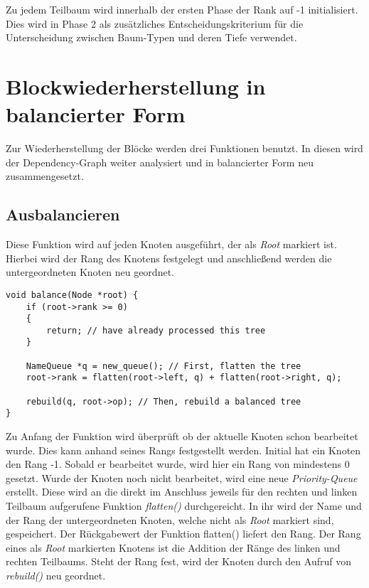 Zu jedem Teilbaum wird innerhalb der ersten Phase der Rank auf -1 initialisiert. Dies wird in Phase 2 als zusätzliches Entscheidungskriterium für die  Unterscheidung zwischen Baum-Typen und deren Tiefe verwendet.

\section{Blockwiederherstellung in balancierter Form}
Zur Wiederherstellung der Blöcke werden drei Funktionen benutzt. In diesen wird der Dependency-Graph weiter analysiert und in balancierter Form neu zusammengesetzt.

\subsection{Ausbalancieren}
Diese Funktion wird auf jeden Knoten ausgeführt, der als \textit{Root} markiert ist. Hierbei wird der Rang des Knotens festgelegt und anschließend werden die untergeordneten Knoten neu geordnet.\\

\begin{lstlisting}[caption=Funktion balance(), label=list:Funktion balace()]
void balance(Node *root) {
	if (root->rank >= 0)
	{
		return; // have already processed this tree
	}

	NameQueue *q = new_queue(); // First, flatten the tree
	root->rank = flatten(root->left, q) + flatten(root->right, q);

	rebuild(q, root->op); // Then, rebuild a balanced tree
}
\end{lstlisting}

Zu Anfang der Funktion wird überprüft ob der aktuelle Knoten schon bearbeitet wurde. Dies kann anhand seines Rangs festgestellt werden. Initial hat ein Knoten den Rang -1. Sobald er bearbeitet wurde, wird hier ein Rang von mindestens 0 gesetzt. Wurde der Knoten noch nicht bearbeitet, wird eine neue \textit{Priority-Queue} erstellt. Diese wird an die direkt im Anschluss jeweils für den rechten und linken Teilbaum aufgerufene Funktion \textit{flatten()} durchgereicht. In ihr wird der Name und der Rang der untergeordneten Knoten, welche nicht als \textit{Root} markiert sind, gespeichert. Der Rückgabewert der Funktion flatten() liefert den Rang. Der Rang eines als \textit{Root} markierten Knotens ist die Addition der Ränge des linken und rechten Teilbaums. Steht der Rang fest, wird der Knoten durch den Aufruf von \textit{rebuild()} neu geordnet.

